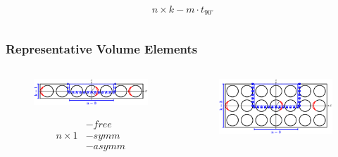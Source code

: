 \documentclass[first,firstsupp,lastsupp,last,hyperref,table]{ETHclass}
\begin{document}
\begin{frame}
\begin{columns}[c]
\begin{column}{0.45\textwidth}
\begin{figure}
\end{figure}
\vspace{-0.25cm}
\begin{equation*}
n\times  k-m\cdot t_{90^{\circ}}
\end{equation*}
\end{column}
\end{columns}
\end{frame}

\addtocounter{framenumber}{-1}

\begin{frame}
\frametitle{\vspace{0.2cm}\small Representative Volume Elements}
\vspace{-1.25cm}
\centering
\begin{columns}[c]
\begin{column}{0.55\textwidth}
\centering
\begin{figure}
\centering
\includegraphics[width=\columnwidth]{freeThinPly.pdf}
\end{figure}
\begin{equation*}
\begin{aligned}
&-free\\
n\times 1&-symm\\
&-asymm\\
\end{aligned}
\end{equation*}
\end{column}
\begin{column}{0.45\textwidth}
\centering
\begin{figure}
\centering
\includegraphics[width=\columnwidth]{freeThickPly.pdf}

\end{figure}
\end{column}
\end{columns}
\end{frame}
\end{document}
